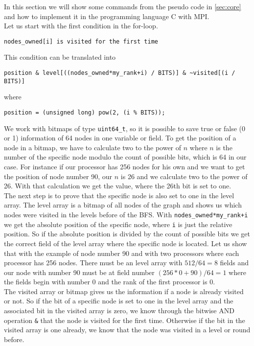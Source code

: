 \documentclass[12pt,a4paper]{article}
\begin{document}
In this section we will show some commands from the pseudo code in \ref{sec:core} and how to implement it in the programming language C with MPI. \\
Let us start with the first condition in the for-loop. 
\begin{lstlisting}
nodes_owned[i] is visited for the first time
\end{lstlisting}
This condition can be translated into
\begin{lstlisting}
position & level[((nodes_owned*my_rank+i) / BITS)] & ~visited[(i / BITS)]
\end{lstlisting}
where 
\begin{lstlisting}
position = (unsigned long) pow(2, (i % BITS));
\end{lstlisting}
We work with bitmaps of type \lstinline{uint64_t}, so it is possible to save true or false (0 or 1) information of 64 nodes in one variable or field. To get the position of a node in a bitmap, we have to calculate two to the power of \(n\) where \(n\) is the number of the specific node modulo the count of possible bits, which is 64 in our case. For instance if our processor has 256 nodes for his own and we want to get the position of node number 90, our \(n\) is 26 and we calculate two to the power of 26. With that calculation we get the value, where the 26th bit is set to one.\\
The next step is to prove that the specific node is also set to one in the level array. The level array is a bitmap of all nodes of the graph and shows us which nodes were visited in the levels before of the BFS. With \lstinline{nodes_owned*my_rank+i} we get the absolute position of the specific node, where \lstinline{i} is just the relative position. So if the absolute position is divided by the count of possible bits we get the correct field of the level array where the specific node is located. Let us show that with the example of node number 90 and with two processors where each processor has 256 nodes. There must be an level array with \(512/64 = 8\) fields and our node with number 90 must be at field number \((256*0+90) / 64 = 1\) where the fields begin with number 0 and the rank of the first processor is 0.\\
The visited array or bitmap gives us the information if a node is already visited or not. So if the bit of a specific node is set to one in the level array and the associated bit in the visited array is zero, we know through the bitwise AND operation \lstinline{&} that the node is visited for the first time. Otherwise if the bit in the visited array is one already, we know that the node was visited in a level or round before.\\
\end{document}
